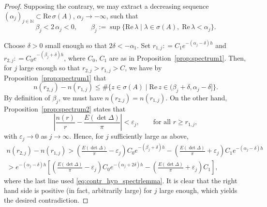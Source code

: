 \documentclass[a4paper, 12pt, oneside, reqno, notitlepage]{amsart}
\theoremstyle{plain}
\theoremstyle{definition}
\theoremstyle{remark}
\begin{document}
\begin{proof}
    Supposing the contrary, we may extract a decreasing sequence $(\alpha_j)_{j \in \mathbb{N}} \subset \mathrm{Re} \, \sigma(A)$,  $\alpha_j \to -\infty$, such that 
    \begin{equation}
        \beta_j < 2 \, \alpha_j < 0, \qquad \beta_j := \sup \{ \mathrm{Re} \, \lambda \; | \; \lambda \in \sigma(A), \; \mathrm{Re} \, \lambda < \alpha_j \}.
        \label{eq:contr_hyp_spectrlemma}
    \end{equation}

    Choose $\delta > 0 $ small enough so that $2\delta < -\alpha_1$.
    Set $r_{1,j} : = C_1e^{-(\alpha_j - \delta) h}$ and $r_{2,j} : = C_0e^{-(\beta_j + \delta) h}$, where $C_0$, $C_1$ are as in Proposition~\ref{prop:spectrum1}.
    Then, for $j$ large enough so that $r_{2,j}>r_{1,j} > C$, we have by Proposition~\ref{prop:spectrum1} that
    \begin{displaymath}
        n(r_{2,j}) - n(r_{1,j}) \leq \#  \{ z \in \sigma(A) \; | \; \mathrm{Re} \, z \in ( \beta_j+\delta, \alpha_j - \delta ] \}.
    \end{displaymath}
    By definition of $\beta_j$, we must have $n(r_{2,j}) = n(r_{1,j}) $.
    On the other hand, Proposition~\ref{prop:spectrum2} states that
    \begin{displaymath}
        \left| \frac{n(r)}{r} - \frac{E( \det \Delta)}{\pi} \right| < \varepsilon_j, \qquad \text{for all } r \geq r_{1,j},
    \end{displaymath}
    with $\varepsilon_j \to 0$ as $j \to \infty$.
    Hence, for $j$ sufficiently large as above,
    \begin{multline*}
        n(r_{2,j}) - n(r_{1,j}) > \left( \frac{E (\det \Delta)}{\pi} - \varepsilon_j \right) C_0e^{-(\beta_j + \delta) h} - \left( \frac{E (\det \Delta)}{\pi} + \varepsilon_j \right) C_1e^{-(\alpha_j - \delta) h} \\
        > e^{-(\alpha_j - \delta) h } \left[ \left( \frac{E (\det \Delta)}{\pi} - \varepsilon_j \right) C_0e^{-(\alpha_j + 2\delta) h} - \left( \frac{E (\det \Delta)}{\pi} + \varepsilon_j \right) C_1\right],
    \end{multline*}
    where the last line used \eqref{eq:contr_hyp_spectrlemma}.
    It is clear that the right hand side is positive (in fact, arbitrarily large) for $j$ large enough, which yields the desired contradiction.
\end{proof}
\end{document}
